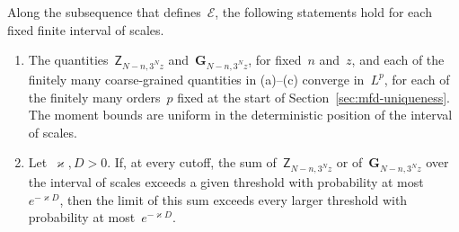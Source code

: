 \documentclass[11pt]{amsart}
\begin{document}
\begin{lemma}
\label{mfd:lem-prefix-limit}
Along the subsequence that defines~$\mathscr E$, the following statements hold for each fixed finite interval of scales.
\begin{enumerate}[label=(\roman*),leftmargin=*]
\item The quantities~$\mathsf Z_{N-n,3^Nz}$ and~$\mathbf G_{N-n,3^Nz}$, for fixed~$n$ and~$z$, and each of the finitely many coarse-grained quantities in (a)--(c) converge in~$L^p$, for each of the finitely many orders~$p$ fixed at the start of Section~\ref{sec:mfd-uniqueness}. The moment bounds are uniform in the deterministic position of the interval of scales.
\item Let~$\varkappa,D>0$. If, at every cutoff, the sum of~$\mathsf Z_{N-n,3^Nz}$ or of~$\mathbf G_{N-n,3^Nz}$ over the interval of scales exceeds a given threshold with probability at most~$e^{-\varkappa D}$, then the limit of this sum exceeds every larger threshold with probability at most~$e^{-\varkappa D}$.
\end{enumerate}
\end{lemma}
\end{document}
